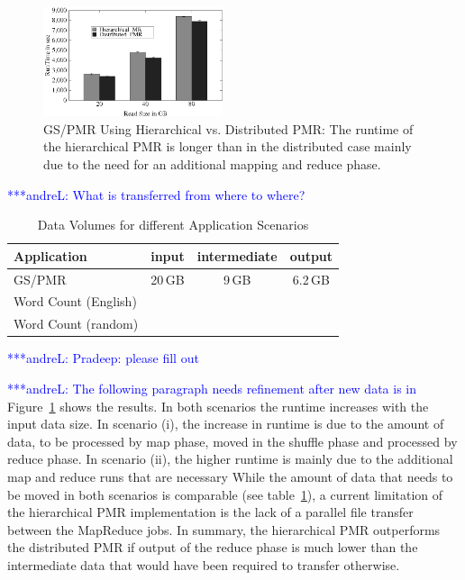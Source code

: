 \documentclass{acm_proc_article-sp}
\newcommand{\alnote}[1]{ {\textcolor{blue} { ***andreL: #1 }}}
\newcommand{\alnote}[1]{}
\begin{document}
\begin{figure}[ht]
	\centering
		\includegraphics[width=0.47\textwidth]{figures/hmrvsdpmr.png}
\caption{GS/PMR Using Hierarchical vs. Distributed PMR: The runtime of the hierarchical PMR is longer than in the distributed case mainly due to the need for an additional mapping and reduce phase.} 	
\label{fig:hmrvsdist}
\end{figure}		


\alnote{What is transferred from where to where?}
\begin{table}[h]
\begin{tabular}{|l|c|c|c|}
\hline
\textbf{Application} &\textbf{input} &\textbf{intermediate} &\textbf{output}\\
\hline
GS/PMR 		&20\,GB &9\,GB		 &6.2\,GB\\
\hline
Word Count (English) & & &\\
\hline
Word Count (random) & & &\\
\hline
\end{tabular}
\caption{Data Volumes for different Application Scenarios}
\label{tab:data-volumes}
\alnote{Pradeep: please fill out}
\end{table}


\alnote{The following paragraph needs refinement after new data is in}
Figure~\ref{fig:hmrvsdist} shows the results. In both scenarios the runtime
increases with the input data size. In scenario (i), the increase in runtime is
due to the amount of data, to be processed by map phase, moved in the shuffle
phase and processed by reduce phase. In scenario (ii), the higher runtime is
mainly due to the additional map and reduce runs that are necessary While the
amount of data that needs to be moved in both scenarios is comparable (see
table~\ref{tab:data-volumes}), a current limitation of the hierarchical PMR
implementation is the lack of a parallel file transfer between the MapReduce
jobs. In summary, the hierarchical PMR outperforms the distributed PMR if output
of the reduce phase is much lower than the intermediate data that would have
been required to transfer otherwise.
\end{document}
